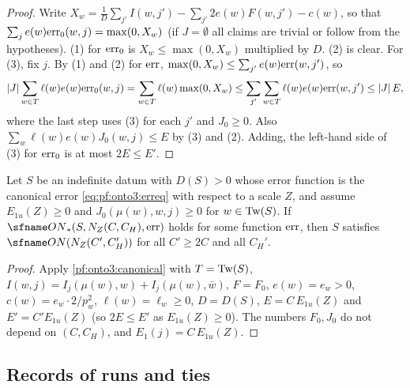 \begin{proof}
Write $X_w=\frac1D\sum_{j'}I(w,j')-\sum_{j'}2e(w)F(w,j')-c(w)$, so that $\sum_je(w)\mathrm{err}_0(w,j)=\max(0,X_w)$
(if $J=\emptyset$ all claims are trivial or follow from the hypotheses). (1) for $\mathrm{err}_0$ is $X_w\le
\max(0,X_w)$ multiplied by $D$. (2) is clear. For (3), fix $j$. By (1) and (2) for $\mathrm{err}$,
$\max(0,X_w)\le\sum_{j'}e(w)\mathrm{err}(w,j')$, so
\[
|J|\sum_{w\in T}\ell(w)e(w)\mathrm{err}_0(w,j)=\sum_{w\in T}\ell(w)\max(0,X_w)\le\sum_{j'}\sum_{w\in T}
\ell(w)e(w)\mathrm{err}(w,j')\le|J|\,E ,
\]
where the last step uses (3) for each $j'$ and $J_0\ge0$. Also $\sum_w\ell(w)e(w)J_0(w,j)\le E$ by (3) and (2).
Adding, the left-hand side of (3) for $\mathrm{err}_0$ is at most $2E\le E'$.
\end{proof}

\begin{corollary}\label{pf:onto3:onwith}
Let $S$ be an indefinite datum with $D(S)>0$ whose error function is the canonical error
\eqref{eq:pf:onto3:erreq} with respect to a scale $Z$, and assume $E_{1u}(Z)\ge0$ and $J_0(\mu(w),w,j)\ge0$ for
$w\in\mathrm{Tw}(S)$. If $\ontothreeONw(S,N_Z(C,C_H),\ontothreeerr)$ holds for some function
$\mathrm{err}$, then $S$ satisfies $\ontothreeON(N_Z(C',C_H'))$ for all $C'\ge2C$ and all $C_H'$.
\end{corollary}

\begin{proof}
Apply \cref{pf:onto3:canonical} with $T=\mathrm{Tw}(S)$, $I(w,j)=I_j(\mu(w),w)+I_j(\mu(w),\bar w)$, $F=F_0$,
$e(w)=e_w>0$, $c(w)=e_w\cdot2/p_w^2$, $\ell(w)=\ell_w\ge0$, $D=D(S)$, $E=C\,E_{1u}(Z)$ and $E'=C'E_{1u}(Z)$ (so
$2E\le E'$ as $E_{1u}(Z)\ge0$). The numbers $F_0,J_0$ do not depend on $(C,C_H)$, and $E_1(j)=C\,E_{1u}(Z)$.
\end{proof}

\subsection{Records of runs and ties}\label{sec:pf:onto3:ties}

